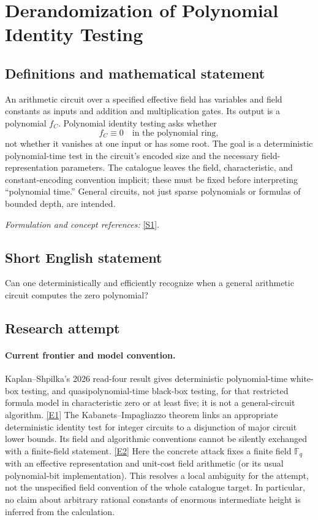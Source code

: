 \documentclass[11pt,a4paper]{article}
\numberwithin{equation}{section}
\newcommand{\F}{\mathbb{F}}
\newcommand{\sref}[2]{\hyperlink{source:#1:#2}{[S#2]}}
\newcommand{\eref}[2]{\hyperlink{extra:#1:#2}{[E#2]}}
\newif\ifshowcatalogue
\newcommand{\cataloguescope}[1]{\ifshowcatalogue
 \paragraph{Exact scope in the supplied catalogue.}
 \begin{quote}\small #1\end{quote}\fi}
\begin{document}
\setcounter{section}{69}
\section{\texorpdfstring{Derandomization of Polynomial Identity Testing}{Derandomization of Polynomial Identity Testing}}\label{70}
\subsection{Definitions and mathematical statement}
An arithmetic circuit over a specified effective field has variables and field constants as inputs and addition and multiplication gates. Its output is a polynomial $f_C$. Polynomial identity testing asks whether
\[
 f_C\equiv0\quad\text{in the polynomial ring},
\]
not whether it vanishes at one input or has some root. The goal is a deterministic polynomial-time test in the circuit's encoded size and the necessary field-representation parameters. The catalogue leaves the field, characteristic, and constant-encoding convention implicit; these must be fixed before interpreting ``polynomial time.'' General circuits, not just sparse polynomials or formulas of bounded depth, are intended.
\par\smallskip\textit{Formulation and concept references:} \sref{70}{1}.
\cataloguescope{Determine whether polynomial identity testing for arithmetic circuits (deciding whether a given arithmetic circuit computes the identically zero polynomial) can be derandomized into deterministic polynomial time.}
\subsection{Short English statement}
Can one deterministically and efficiently recognize when a general arithmetic circuit computes the zero polynomial?
\subsection{Research attempt}

\paragraph{Current frontier and model convention.}
Kaplan--Shpilka's 2026 read-four result gives deterministic polynomial-time
white-box testing, and quasipolynomial-time black-box testing, for that
restricted formula model in characteristic zero or at least five; it is
not a general-circuit algorithm. \eref{70}{1}
The Kabanets--Impagliazzo theorem links an appropriate deterministic
identity test for integer circuits to a disjunction of major circuit lower
bounds. Its field and algorithmic conventions cannot be silently exchanged
with a finite-field statement. \eref{70}{2}
Here the concrete attack fixes a finite field $\F_q$ with an effective
representation and unit-cost field arithmetic (or its usual polynomial-bit
implementation). This resolves a local ambiguity for the attempt, not the
unspecified field convention of the whole catalogue target. In particular,
no claim about arbitrary rational constants of enormous intermediate height
is inferred from the calculation.
\end{document}
